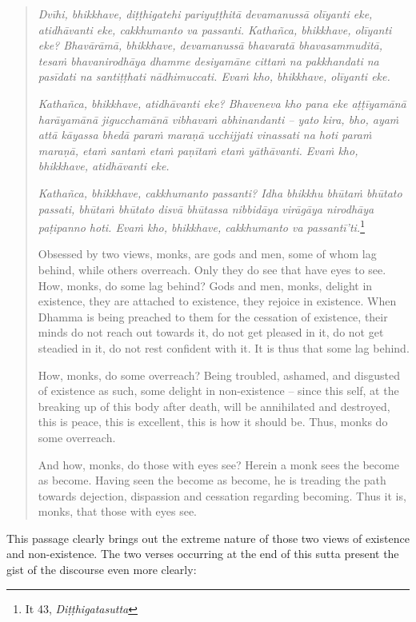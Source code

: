 \enlargethispage{2\baselineskip}

\begin{quote}
\emph{Dvīhi, bhikkhave, diṭṭhigatehi pariyuṭṭhitā devamanussā olīyanti eke, atidhāvanti eke, cakkhumanto va passanti. Kathañca, bhikkhave, olīyanti eke? Bhavārāmā, bhikkhave, devamanussā bhavaratā bhavasammuditā, tesaṁ bhavanirodhāya dhamme desiyamāne cittaṁ na pakkhandati na pasīdati na santiṭṭhati nādhimuccati. Evaṁ kho, bhikkhave, olīyanti eke.}

\emph{Kathañca, bhikkhave, atidhāvanti eke? Bhaveneva kho pana eke aṭṭīyamānā harāyamānā jigucchamānā vibhavaṁ abhinandanti -- yato kira, bho, ayaṁ attā kāyassa bhedā paraṁ maraṇā ucchijjati vinassati na hoti paraṁ maraṇā, etaṁ santaṁ etaṁ paṇītaṁ etaṁ yāthāvanti. Evaṁ kho, bhikkhave, atidhāvanti eke.}

\emph{Kathañca, bhikkhave, cakkhumanto passanti? Idha bhikkhu bhūtaṁ bhūtato passati, bhūtaṁ bhūtato disvā bhūtassa nibbidāya virāgāya nirodhāya paṭipanno hoti. Evaṁ kho, bhikkhave, cakkhumanto va passantī'ti.}\footnote{It 43, \emph{Diṭṭhigatasutta}}

Obsessed by two views, monks, are gods and men, some of whom lag behind, while others overreach. Only they do see that have eyes to see. How, monks, do some lag behind? Gods and men, monks, delight in existence, they are attached to existence, they rejoice in existence. When Dhamma is being preached to them for the cessation of existence, their minds do not reach out towards it, do not get pleased in it, do not get steadied in it, do not rest confident with it. It is thus that some lag behind.

How, monks, do some overreach? Being troubled, ashamed, and disgusted of existence as such, some delight in non-existence -- since this self, at the breaking up of this body after death, will be annihilated and destroyed, this is peace, this is excellent, this is how it should be. Thus, monks do some overreach.

And how, monks, do those with eyes see? Herein a monk sees the become as become. Having seen the become as become, he is treading the path towards dejection, dispassion and cessation regarding becoming. Thus it is, monks, that those with eyes see.
\end{quote}

This passage clearly brings out the extreme nature of those two views of existence and non-existence. The two verses occurring at the end of this sutta present the gist of the discourse even more clearly:

